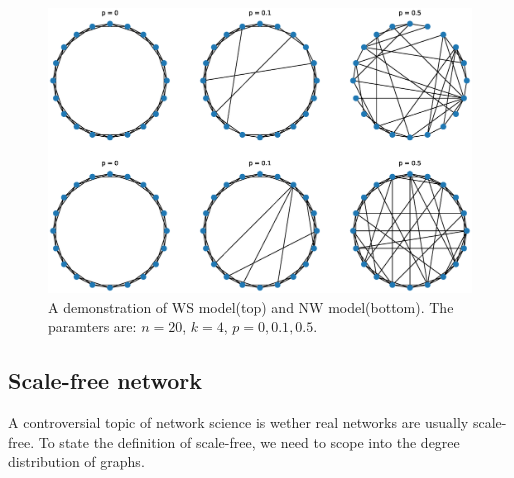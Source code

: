 \documentclass[12pt]{article}
\begin{document}
\begin{figure}[ht]
    \includegraphics[width = \textwidth]{small_world_network_model.eps}
    \centering
    \caption{A demonstration of WS model(top) and NW model(bottom). The paramters are: $n=20$, $k=4$, $p=0,0.1,0.5$.}
    \label{fig:small_world_models}
\end{figure}

\subsection{Scale-free network}
A controversial topic of network science is wether real networks are usually scale-free. To state the definition of scale-free, we need to scope into the degree distribution of graphs.\\
\end{document}
